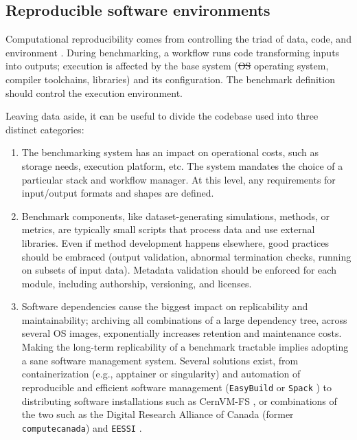\documentclass[11pt]{article}
\begin{document}
\subsection*{Reproducible software environments \label{softwareenvs}}

Computational reproducibility comes from controlling the triad of data, code, and environment \cite{Hill2024-gf}. During benchmarking, a workflow runs code transforming inputs into outputs; execution is affected by the base system ({\color{red}\sout{OS} operating system}, compiler toolchains, libraries) and its configuration. The benchmark definition should control the execution environment.

Leaving data aside, it can be useful to divide the codebase used into three distinct categories:

\begin{enumerate}
\item The benchmarking system has an impact on operational costs, such as storage needs, execution platform, etc.  The system mandates the choice of a particular stack and workflow manager. At this level, any requirements for input/output formats and shapes are defined.

\item Benchmark components, like dataset-generating simulations, methods, or metrics, are typically small scripts that process data and use external libraries. Even if method development happens elsewhere, good practices should be embraced (output validation, abnormal termination checks, running on subsets of input data).  Metadata validation should be enforced for each module, including authorship, versioning, and licenses.

\item Software dependencies cause the biggest impact on replicability and maintainability; archiving all combinations of a large dependency tree, across several OS images, exponentially increases retention and maintenance costs. Making the long-term replicability of a benchmark tractable implies adopting a sane software management system. Several solutions exist, from containerization (e.g., apptainer or singularity) \cite{Kurtzer2017-mn} and automation of reproducible and efficient software management (\texttt{EasyBuild} \cite{Hoste2012-gg} or \texttt{Spack} \cite{Gamblin2015-ll}) to distributing software installations such as CernVM-FS \cite{Blomer2013-jk},  or combinations of the two such as the Digital Research Alliance of Canada (former \texttt{computecanada}) \cite{Boissonneault2019-wm} and \texttt{EESSI} \cite{droge2023-ax}.

\end{enumerate}
\end{document}
